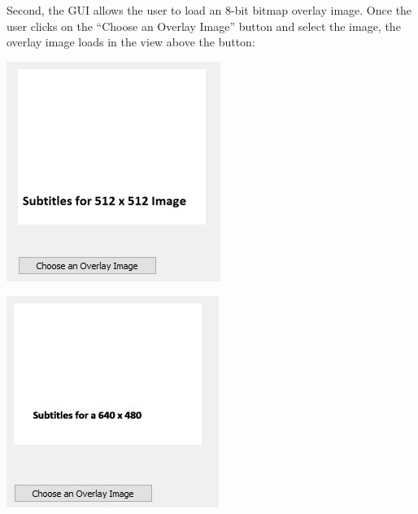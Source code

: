\documentclass{article}
\newenvironment{Figure}
  {\par\medskip\noindent\ignorespaces\minipage{\linewidth}}
  {\endminipage\par\medskip}
\begin{document}
\begin{multicols*}{2}
Second, the GUI allows the user to load an 8-bit bitmap overlay image. Once the user clicks on the “Choose an Overlay Image” button and select the image, the overlay image loads in the view above the button:


\begin{Figure}
 \centering
 \includegraphics[width=\linewidth]{OverlayImage.jpg}
\end{Figure}

\begin{Figure}
 \centering
 \includegraphics[width=\linewidth]{OverlayImage2.jpg}
\end{Figure}


\end{multicols*}
\end{document}
